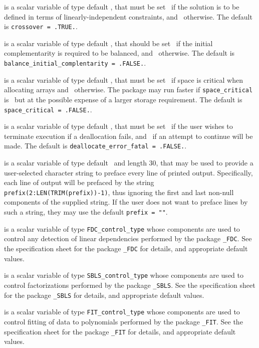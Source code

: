 \begin{description}
 is a scalar variable of type default \logical,
that must be set \true\ if the solution is to be defined in terms
of linearly-independent constraints,
and  \false\ otherwise.
The default is {\tt crossover = .TRUE.}.

 is a scalar variable of type 
default \logical, that should be set \true\
if the initial complementarity is required to be balanced,
and \false\ otherwise.
The default is {\tt balance\_initial\_complentarity = .FALSE.}.

 is a scalar variable of type default \logical,
that must be set \true\ if space is critical when allocating arrays
and  \false\ otherwise. The package may run faster if
{\tt space\_critical} is \false\ but at the possible expense of a larger
storage requirement. The default is {\tt space\_critical = .FALSE.}.

 is a scalar variable of type default \logical,
that must be set \true\ if the user wishes to terminate execution if
a deallocation  fails, and \false\ if an attempt to continue
will be made. The default is {\tt deallocate\_error\_fatal = .FALSE.}.

 is a scalar variable of type default \character\
and length 30, that may be used to provide a user-selected
character string to preface every line of printed output.
Specifically, each line of output will be prefaced by the string
{\tt prefix(2:LEN(TRIM(prefix))-1)},
thus ignoring the first and last non-null components of the
supplied string. If the user does not want to preface lines by such
a string, they may use the default {\tt prefix = ""}.

 is a scalar variable of type
{\tt FDC\_control\_type}
whose components are used to control any detection of linear dependencies
performed by the package
{\tt \libraryname\_FDC}.
See the specification sheet for the package
{\tt \libraryname\_FDC}
for details, and appropriate default values.

 is a scalar variable of type
{\tt SBLS\_control\_type}
whose components are used to control factorizations
performed by the package
{\tt \libraryname\_SBLS}.
See the specification sheet for the package
{\tt \libraryname\_SBLS}
for details, and appropriate default values.

 is a scalar variable of type
{\tt FIT\_control\_type}
whose components are used to control fitting of data to polynomials
performed by the package
{\tt \libraryname\_FIT}.
See the specification sheet for the package
{\tt \libraryname\_FIT}
for details, and appropriate default values.


\end{description}
